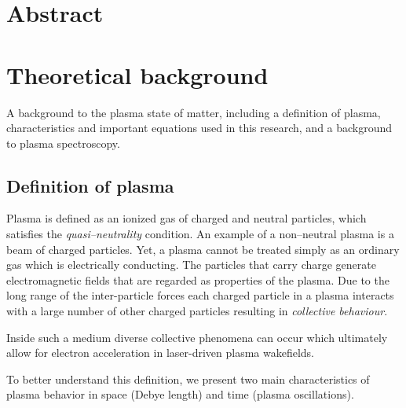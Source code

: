 \documentclass[justified,nofonts,nobib,openany]{tufte-book}
\begin{document}
\chapter{Abstract}\label{chap:abstract}
\chapter{Theoretical background}\label{chap:background}
A background to the plasma state of matter, including a definition of plasma, characteristics and important equations used in this research, and a background to plasma spectroscopy.
\section{Definition of plasma}
Plasma is defined \cite{Chen1984IntroductionFusion} as an ionized gas of charged and neutral particles, which satisfies the \emph{quasi--neutrality} condition. An example of a non--neutral plasma is a beam of charged particles. Yet, a plasma cannot be treated simply as an ordinary gas which is electrically conducting. The particles that carry charge generate electromagnetic fields that are regarded as properties of the plasma. Due to the long range of the inter-particle forces each charged particle in a plasma interacts with a large number of other charged particles resulting in \emph{collective behaviour}.

Inside such a medium diverse collective phenomena can occur which ultimately allow for electron acceleration in laser-driven plasma wakefields.

To better understand this definition, we present two main characteristics of plasma behavior in space (Debye length) and time (plasma oscillations).
\end{document}
